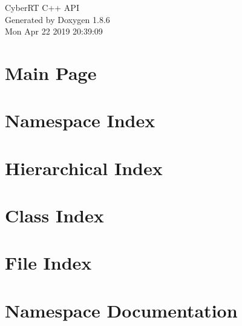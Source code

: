 \documentclass[twoside]{book}
\newcommand{\clearemptydoublepage}{%
  \newpage{\pagestyle{empty}\cleardoublepage}%
}
\begin{document}
\hypersetup{pageanchor=false}
\begin{titlepage}
\vspace*{7cm}
\begin{center}%
{\Large Cyber\-R\-T C++ A\-P\-I }\\
\vspace*{1cm}
{\large Generated by Doxygen 1.8.6}\\
\vspace*{0.5cm}
{\small Mon Apr 22 2019 20:39:09}\\
\end{center}
\end{titlepage}
\clearemptydoublepage
\tableofcontents
\clearemptydoublepage
{}
\hypersetup{pageanchor=true}

\chapter{Main Page}
\label{index}\hypertarget{index}{}
\chapter{Namespace Index}

\chapter{Hierarchical Index}

\chapter{Class Index}

\chapter{File Index}

\chapter{Namespace Documentation}






























\end{document}
